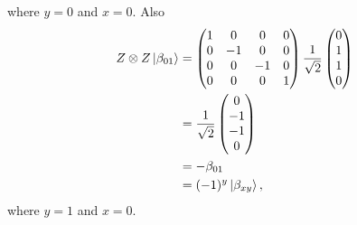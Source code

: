 \documentclass[10pt]{article}
\begin{document}
where $y = 0$ and $x = 0$.
Also
\begin{align*}
Z \otimes Z \ket{\beta_{01}} &= \begin{pmatrix}
1 &  0  & 0   & 0 \\
0 & -1 & 0   & 0 \\
0 &  0  & -1 & 0 \\
0 &  0  &  0  & 1
\end{pmatrix}
\frac{1}{\sqrt{2}} 
\begin{pmatrix}
0 \\
1 \\
1 \\
0
\end{pmatrix} \\
&= \frac{1}{\sqrt{2}}
\begin{pmatrix}
0 \\
-1 \\
-1 \\
0
\end{pmatrix} \\
&= -\beta_{01} \\
&= (-1)^y \ket{\beta_{xy}},
\end{align*}
where $y = 1$ and $x = 0$.
\end{document}

